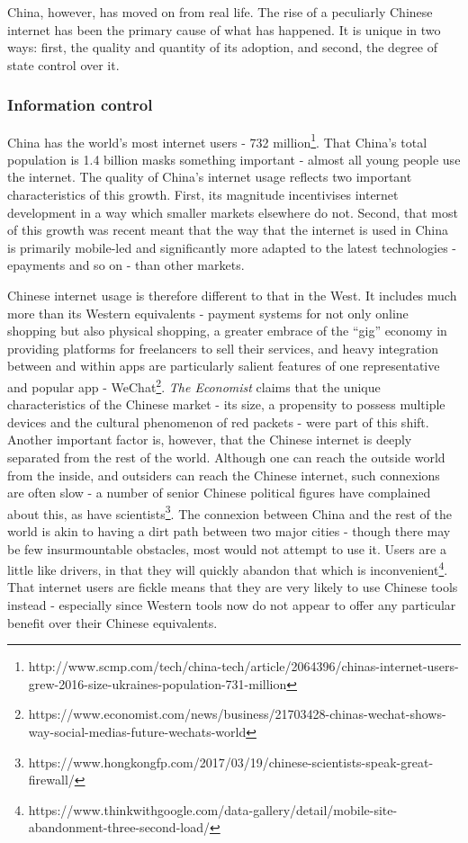 China, however, has moved on from real life. The rise of a peculiarly
Chinese internet has been the primary cause of what has happened. It is
unique in two ways: first, the quality and quantity of its adoption, and
second, the degree of state control over it.

\subsubsection{Information control}\label{information-control}

China has the world's most internet users - 732 million\footnote{http://www.scmp.com/tech/china-tech/article/2064396/chinas-internet-users-grew-2016-size-ukraines-population-731-million}.
That China's total population is 1.4 billion masks something important -
almost all young people use the internet. The quality of China's
internet usage reflects two important characteristics of this growth.
First, its magnitude incentivises internet development in a way which
smaller markets elsewhere do not. Second, that most of this growth was
recent meant that the way that the internet is used in China is
primarily mobile-led and significantly more adapted to the latest
technologies - epayments and so on - than other markets.

Chinese internet usage is therefore different to that in the West. It
includes much more than its Western equivalents - payment systems for
not only online shopping but also physical shopping, a greater embrace
of the ``gig'' economy in providing platforms for freelancers to sell
their services, and heavy integration between and within apps are
particularly salient features of one representative and popular app -
WeChat\footnote{https://www.economist.com/news/business/21703428-chinas-wechat-shows-way-social-medias-future-wechats-world}.
\emph{The Economist} claims that the unique characteristics of the
Chinese market - its size, a propensity to possess multiple devices and
the cultural phenomenon of red packets - were part of this shift.
Another important factor is, however, that the Chinese internet is
deeply separated from the rest of the world. Although one can reach the
outside world from the inside, and outsiders can reach the Chinese
internet, such connexions are often slow - a number of senior Chinese
political figures have complained about this, as have
scientists\footnote{https://www.hongkongfp.com/2017/03/19/chinese-scientists-speak-great-firewall/}.
The connexion between China and the rest of the world is akin to having
a dirt path between two major cities - though there may be few
insurmountable obstacles, most would not attempt to use it. Users are a
little like drivers, in that they will quickly abandon that which is
inconvenient\footnote{https://www.thinkwithgoogle.com/data-gallery/detail/mobile-site-abandonment-three-second-load/}.
That internet users are fickle means that they are very likely to use
Chinese tools instead - especially since Western tools now do not appear
to offer any particular benefit over their Chinese equivalents.

